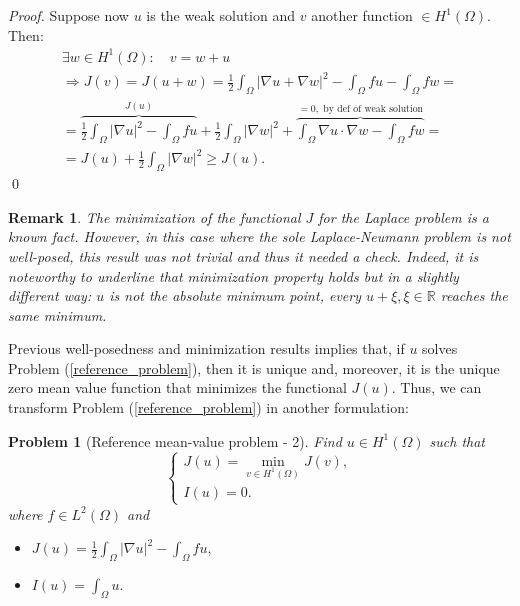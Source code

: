 \documentclass[a4paper,11pt]{article}
\newtheorem{problem}{Problem}
\newtheorem*{remark}{Remark}
\begin{document}
\begin{proof}
     \noindent Suppose now $u$ is the weak solution and $v$ another function $\in H^1(\Omega)$. Then:
     \begin{equation*}
     \begin{gathered}
     \exists w \in H^1(\Omega): \quad v = w+u \\
     \Rightarrow J(v)=J(u+w)= \frac{1}{2}\int_{\Omega}|\nabla u + \nabla w|^2 - \int_{\Omega}{fu}- \int_{\Omega}{fw} = \\
     = \overbrace{\frac{1}{2}\int_{\Omega}|\nabla u|^2 - \int_{\Omega}{fu}}^{J(u)} + \frac{1}{2}\int_{\Omega}|\nabla w|^2 + \overbrace{\int_{\Omega}\nabla u \cdot \nabla w - \int_{\Omega}{fw}}^{=0, \text { by def of weak solution}} =\\
     = J(u) + \frac{1}{2}\int_{\Omega}|\nabla w| ^2 \geq J(u).
     \end{gathered}
     \end{equation*}
     \qed
\end{proof}

\begin{remark}
	The minimization of the functional $J$ for the Laplace problem is a known fact. However, in this case where the sole Laplace-Neumann problem is not well-posed, this result was not trivial and thus it needed a check. Indeed, it is noteworthy to underline that minimization property holds but in a slightly different way: $u$ is not the absolute minimum point, every $u+\xi, \xi\in\mathbb{R}$ reaches the same minimum.
\end{remark}\vspace{4mm}

\noindent Previous well-posedness and minimization results implies that, if $u$ solves Problem (\ref{reference_problem}), then it is unique and, moreover, it is the unique zero mean value function that minimizes the functional $J(u)$. Thus, we can transform Problem (\ref{reference_problem}) in another formulation:\\

\begin{problem}[Reference mean-value problem - 2] \label{reference_problem_2} Find $u\in H^1(\Omega)$ such that
	\begin{equation*}
	\begin{cases}
	J(u)=\displaystyle \min_{v\in H^1(\Omega)} J(v),\\
	I(u) = 0.
	\end{cases}
	\end{equation*}
 where $f\in L^2(\Omega)$ and  \vspace{2mm}
	\begin{itemize}
		\item $J(u) = \frac{1}{2}\int_{\Omega} |\nabla u |^2 - \int_{\Omega}fu,$
		\item $I(u) = \int_{\Omega} u. $
	\end{itemize}
\end{problem}\vspace{3mm}
\end{document}
